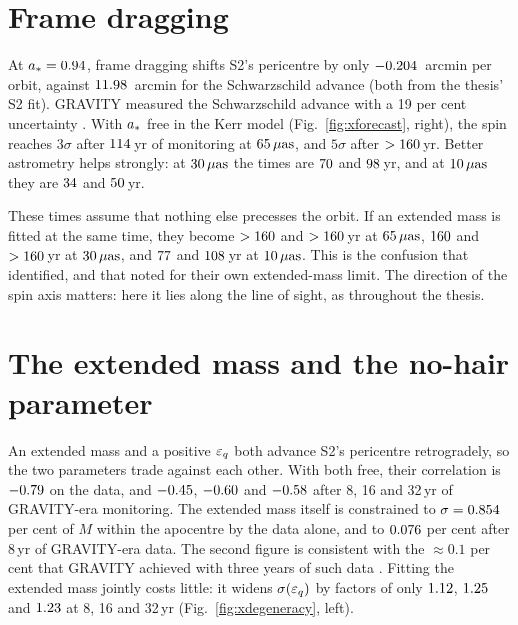 \section{Frame dragging}

At $a_* = 0.94$, frame dragging shifts S2's pericentre by only
$-0.204$~arcmin per orbit, against $11.98$~arcmin for the Schwarzschild
advance (both from the thesis' S2 fit). GRAVITY measured the Schwarzschild
advance with a 19 per cent uncertainty \citep{Gravity2020}. With $a_*$
free in the Kerr model
(Fig.~\ref{fig:xforecast}, right), the spin reaches $3\sigma$ after
$114$\,yr of monitoring at $65\,\mu\mathrm{as}$, and $5\sigma$ after
$>160$\,yr. Better astrometry helps strongly: at $30\,\mu\mathrm{as}$
the times are $70$ and $98$\,yr, and at
$10\,\mu\mathrm{as}$ they are $34$ and $50$\,yr.

These times assume that nothing else precesses the orbit. If an extended mass
is fitted at the same time, they become $>160$ and
$>160$\,yr at $65\,\mu\mathrm{as}$, $160$ and
$>160$\,yr at $30\,\mu\mathrm{as}$, and $77$ and
$108$\,yr at $10\,\mu\mathrm{as}$. This is the confusion that
\citet{Merritt2010} identified, and that \citet{Gravity2020} noted for their
own extended-mass limit. The direction of the spin axis matters: here it lies
along the line of sight, as throughout the thesis.

\section{The extended mass and the no-hair parameter}

An extended mass and a positive $\varepsilon_q$ both advance S2's pericentre
retrogradely, so the two parameters trade against each other. With both free,
their correlation is $-0.79$ on the \citet{Gillessen2017} data, and
$-0.45$, $-0.60$ and $-0.58$ after 8, 16 and
32\,yr of GRAVITY-era monitoring. The extended mass itself is constrained to
$\sigma = 0.854$ per cent of $M$ within the apocentre by the
\citet{Gillessen2017} data alone, and to $0.076$ per cent after
8\,yr of GRAVITY-era data. The second figure is consistent with the $\approx
0.1$ per cent that GRAVITY achieved with three years of such data
\citep{Gravity2020, Gravity2022}. Fitting the extended mass jointly costs
little: it widens $\sigma(\varepsilon_q)$ by factors of only $1.12$,
$1.25$ and $1.23$ at 8, 16 and 32\,yr
(Fig.~\ref{fig:xdegeneracy}, left).

